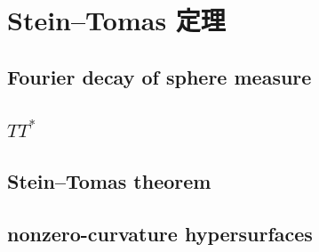 \section{Stein–Tomas 定理}
\label{b2:sec:2304}


\subsection{Fourier decay of sphere measure}
\label{b2:subsec:230401}

\subsection{\texorpdfstring{\(TT^*\)}{TT*}}
\label{b2:subsec:230402}

\subsection{Stein–Tomas theorem}
\label{b2:subsec:230403}

\subsection{nonzero-curvature hypersurfaces}
\label{b2:subsec:230404}


